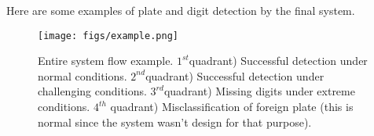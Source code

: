 Here are some examples of plate and digit detection by the final system.

\begin{figure}[H]
	\centering
	\texttt{[image: figs/example.png]}
	\caption[Entire system flow example.]{Entire system flow example. $1^{st}$quadrant) Successful detection under normal conditions. $2^{nd}$quadrant) Successful detection under challenging conditions. $3^{rd}$quadrant) Missing digits under extreme conditions. $4^{th}$ quadrant) Misclassification of foreign plate (this is normal since the system wasn't design for that purpose).}
	\label{fig:examples_detection}
\end{figure}
